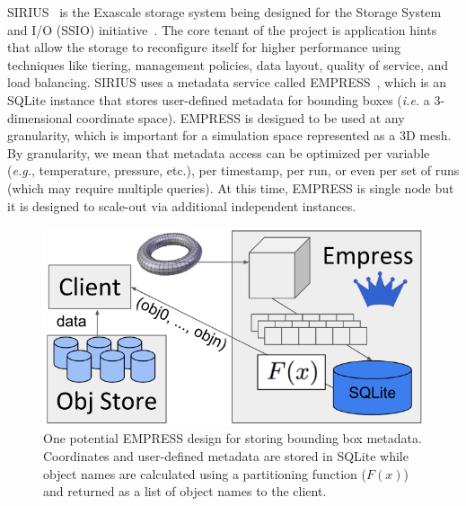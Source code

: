 SIRIUS~\cite{klasky:journal16-sirius} is the Exascale storage system being
designed for the Storage System and I/O (SSIO)
initiative~\cite{ross:report14-ssio}. The core tenant of the project is
application hints that allow the storage to reconfigure itself for higher
performance using techniques like tiering, management policies, data layout,
quality of service, and load balancing.  SIRIUS uses a metadata service called
EMPRESS~\cite{lawson:pdsw17-empress}, which is an SQLite instance that stores
user-defined metadata for bounding boxes ({\it i.e.} a 3-dimensional coordinate
space).  EMPRESS is designed to be used at any granularity, which is important
for a simulation space represented as a 3D mesh. By granularity, we mean that
metadata access can be optimized per variable ({\it e.g.}, temperature,
pressure, etc.), per timestamp, per run, or even per set of runs (which may
require multiple queries).  At this time, EMPRESS is single node but it is
designed to scale-out via additional independent instances.



\begin{figure}[tb]
\centering
  \includegraphics[width=1\textwidth]{./chapters/tintenfisch/figures/empress.png}
  \caption{One potential EMPRESS design for storing bounding box metadata.
Coordinates and user-defined metadata are stored in SQLite while object names
are calculated using a partitioning function (\(F(x)\)) and returned as a list
of object names to the client.}
  \label{fig:empress}
\end{figure}


